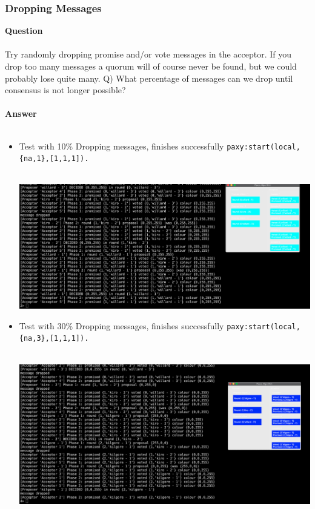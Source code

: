 \documentclass[a4paper, 10pt]{article}
\begin{document}
\subsubsection{Dropping Messages}
\textbf{\large{Question}}\\\\
Try randomly dropping promise and/or vote messages in the acceptor. If you drop
too many messages a quorum will of course never be found, but we could probably
lose quite many. Q) What percentage of messages can we drop until consensus is
not longer possible?
\\\\
\textbf{\large{Answer}}\\\\
\begin{itemize}
\item Test with 10\% Dropping messages, finishes successfully \lstinline|paxy:start(local,{na,1},[1,1,1]).|\\\\
\begin{minipage}[t]{\linewidth}
    \includegraphics[width=\textwidth]{drop1}
\end{minipage}
\item Test with 30\% Dropping messages, finishes successfully \lstinline|paxy:start(local,{na,3},[1,1,1]).|\\\\
  \begin{minipage}[t]{\linewidth}
    \includegraphics[width=\textwidth]{drop3}

\end{minipage}
\end{itemize}
\end{document}

